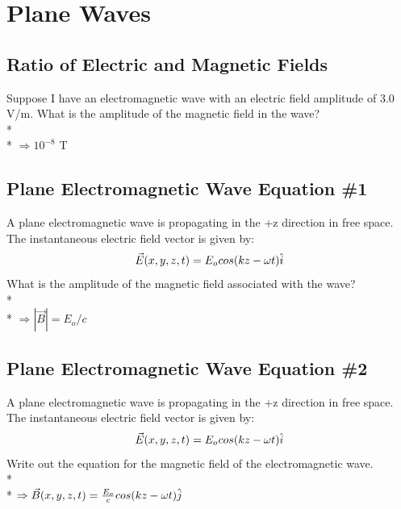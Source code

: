 \documentclass[11pt]{article}
\begin{document}

\pagebreak
\section{Plane Waves}
\vspace{10pt}

\subsection{Ratio of Electric and Magnetic Fields}
Suppose I have an electromagnetic wave with an electric field amplitude of 3.0 V/m.  What is the amplitude of the magnetic field in the wave? \\* \\*
$\Rightarrow 10^{-8}$ T

\subsection{Plane Electromagnetic Wave Equation \#1}
A plane electromagnetic wave is propagating in the +z direction in free space.  The instantaneous electric field vector is given by:
\begin{equation}
\vec{E}(x,y,z,t) = E_o \hspace{0.01cm}cos(kz - \omega t) \hat{i}
\end{equation}
What is the amplitude of the magnetic field associated with the wave?\\* \\*
$\Rightarrow |\vec{B}| = E_o / c$

\subsection{Plane Electromagnetic Wave Equation \#2}
A plane electromagnetic wave is propagating in the +z direction in free space.  The instantaneous electric field vector is given by:
\begin{equation}
\vec{E}(x,y,z,t) = E_o \hspace{0.01cm}cos(kz - \omega t) \hat{i}
\end{equation} 
Write out the equation for the magnetic field of the electromagnetic wave.\\* \\*
$\Rightarrow \vec{B}(x,y,z,t) = \frac{E_o}{c} \hspace{0.01cm}cos(kz - \omega t) \hat{j}$
\end{document}
